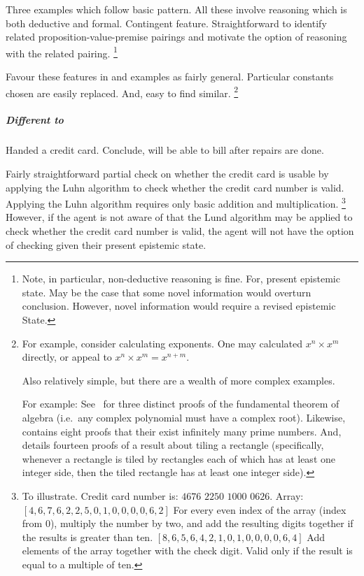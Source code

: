 \begin{note}
  Three examples which follow basic pattern.
  All these involve reasoning which is both deductive and formal.
  Contingent feature.
  Straightforward to identify related proposition-value-premise pairings and motivate the option of reasoning with the related pairing.%
  \footnote{
    Note, in particular, non-deductive reasoning is fine.
    For, present epistemic state.
    May be the case that some novel information would overturn conclusion.
    However, novel information would require a revised epistemic State.
  }

  Favour these features in  and examples as fairly general.
  Particular constants chosen are easily replaced.
  And, easy to find similar.%
  \footnote{
    For example, consider calculating exponents.
    One may calculated \(x^{n} \times x^{m}\) directly, or appeal to \(x^{n} \times x^{m} = x^{n + m}\).
 
    Also relatively simple, but there are a wealth of more complex examples.

    For example:
    See~\textcite{Fine:1997vc} for three distinct proofs of the fundamental theorem of algebra (i.e.\ any complex polynomial must have a complex root).
    Likewise, \textcite{Ribenboim:2012ts} contains eight proofs that their exist infinitely many prime numbers.
    And, \textcite{Wagon:1987vm} details fourteen proofs of a result about tiling a rectangle (specifically, whenever a rectangle is tiled by rectangles each of which has at least one integer side, then the tiled rectangle has at least one integer side).
  }
\end{note}

\subparagraph{Different to}

\begin{note}
  \begin{illustration}
    \label{illu:number-check}
    Handed a credit card.
    Conclude, will be able to bill after repairs are done.
  \end{illustration}

  Fairly straightforward partial check on whether the credit card is usable by applying the Luhn algorithm to check whether the credit card number is valid.
  Applying the Luhn algorithm requires only basic addition and multiplication.%
  \footnote{
    To illustrate.
    Credit card number is:
    \(4676\) \(2250\) \(1000\) \(0626\).
    Array:
    \([4,6,7,6,2,2,5,0,1,0,0,0,0,6,2]\)
    For every even index of the array (index from \(0\)), multiply the number by two, and add the resulting digits together if the results is greater than ten.
    \([8,6,5,6,4,2,1,0,1,0,0,0,0,6,4]\)
    Add elements of the array together with the check digit.
    Valid only if the result is equal to a multiple of ten.
  }
  However, if the agent is not aware of that the Lund algorithm may be applied to check whether the credit card number is valid, the agent will not have the option of checking given their present epistemic state.
\end{note}

